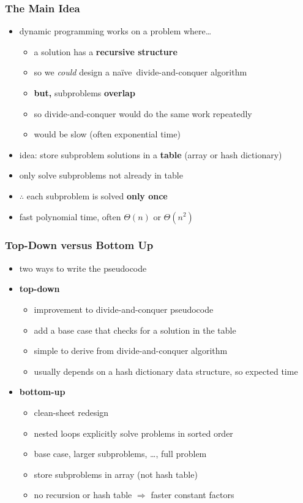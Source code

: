 \documentclass[10pt,aspectratio=169]{beamer}
\newcommand{\naive}{na\"{i}ve~}
\begin{document}
\begin{frame} \frametitle{The Main Idea}
  \begin{itemize}
    \item dynamic programming works on a problem where\dots
    \begin{itemize}
      \item a solution has a \textbf{recursive structure}
      \item so we \emph{could} design a \naive divide-and-conquer algorithm
      \item \textbf{but,} subproblems \textbf{overlap}
      \item so divide-and-conquer would do the same work repeatedly
      \item would be slow (often exponential time)
    \end{itemize}
    \item idea: store subproblem solutions in a \textbf{table} (array or hash dictionary)
    \item only solve subproblems not already in table
    \item $\therefore$ each subproblem is solved \textbf{only once}
    \item fast polynomial time, often $\Theta(n)$ or $\Theta(n^2)$
  \end{itemize}
\end{frame}

\begin{frame} \frametitle{Top-Down versus Bottom Up}
  \begin{itemize}
    \item two ways to write the pseudocode
    \item \textbf{top-down}
    \begin{itemize}
      \item improvement to divide-and-conquer pseudocode
      \item add a base case that checks for a solution in the table
      \item simple to derive from divide-and-conquer algorithm
      \item usually depends on a hash dictionary data structure, so expected time
    \end{itemize}
    \item \textbf{bottom-up}
    \begin{itemize}
      \item clean-sheet redesign
      \item nested loops explicitly solve problems in sorted order
      \item base case, larger subproblems, \dots, full problem
      \item store subproblems in array (not hash table)
      \item no recursion or hash table $\Rightarrow$ faster constant factors
    \end{itemize}
  \end{itemize}
\end{frame}
\end{document}
